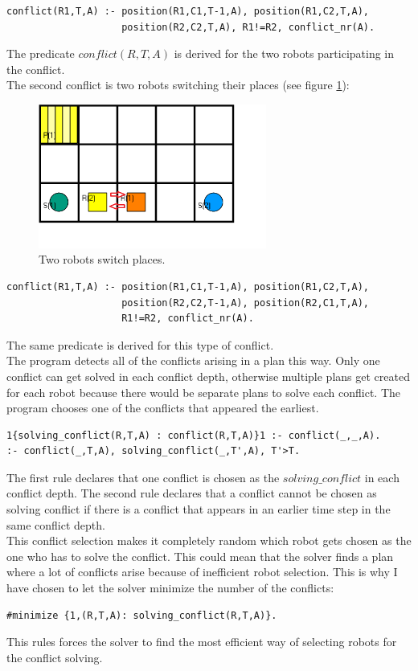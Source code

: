 \documentclass[runningheads]{llncs}
\begin{document}
\begin{verbatim}
conflict(R1,T,A) :- position(R1,C1,T-1,A), position(R1,C2,T,A), 
                    position(R2,C2,T,A), R1!=R2, conflict_nr(A).
\end{verbatim}
The predicate $conflict(R,T,A)$ is derived for the two robots participating in the conflict. \\
The second conflict is two robots switching their places (see figure \ref{fig:c2}):

\begin{figure}[h]
\includegraphics[width=75mm]{Images/Conflict 2}
\caption{Two robots switch places.}
\label{fig:c2}
\end{figure}

\begin{verbatim}
conflict(R1,T,A) :- position(R1,C1,T-1,A), position(R1,C2,T,A), 
                    position(R2,C2,T-1,A), position(R2,C1,T,A), 
                    R1!=R2, conflict_nr(A).
\end{verbatim}
The same predicate is derived for this type of conflict. \\
The program detects all of the conflicts arising in a plan this way. Only one conflict can get solved in each conflict depth, otherwise multiple plans get created for each robot because there would be separate plans to solve each conflict. The program chooses one of the conflicts that appeared the earliest.
\begin{verbatim}
1{solving_conflict(R,T,A) : conflict(R,T,A)}1 :- conflict(_,_,A).
:- conflict(_,T,A), solving_conflict(_,T',A), T'>T.
\end{verbatim}
The first rule declares that one conflict is chosen as the $solving\_conflict$ in each conflict depth. The second rule declares that a conflict cannot be chosen as solving conflict if there is a conflict that appears in an earlier time step in the same conflict depth. \\
This conflict selection makes it completely random which robot gets chosen as the one who has to solve the conflict. This could mean that the solver finds a plan where a lot of conflicts arise because of inefficient robot selection. This is why I have chosen to let the solver minimize the number of the conflicts:
\begin{verbatim}
#minimize {1,(R,T,A): solving_conflict(R,T,A)}.
\end{verbatim}
This rules forces the solver to find the most efficient way of selecting robots for the conflict solving.
\end{document}
